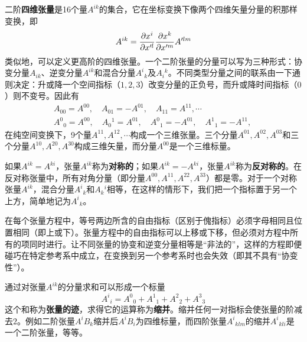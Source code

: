 二阶{\bf 四维张量}是16个量$A^{ik}$的集合，它在坐标变换下像两个四维矢量分量的积那样变换，即
\begin{equation}
	A^{ik} = \frac{\partial x^i}{\partial x'^l} \frac{\partial x^k}{\partial x'^m} A'^{lm}
	\label{chapter1:四维张量的变换规则}
\end{equation}
类似地，可以定义更高阶的四维张量。一个二阶张量的分量可以写为三种形式：协变分量$A_{ik}$、逆变分量$A^{ik}$和混合分量$A^i{}_k$及$A_i{}^k$。不同类型分量之间的联系由一下通则决定：升或降一个空间指标（$1,2,3$）改变分量的正负号，而升或降时间指标（$0$）则不变号。因此有
\begin{align*}
	& A_{00} = A^{00},\quad A_{01} = -A^{01},\quad A_{11} = A^{11},\cdots \\
	& A^0{}_0 = A^{00},\quad A_0{}^1 = A^{01},\quad A^0{}_1 = -A^{01},\quad A^1{}_1 = -A^{11},\quad 
\end{align*}
在纯空间变换下，9个量$A^{11},A^{12},\cdots$构成一个三维张量。三个分量$A^{01},A^{02},A^{03}$和三个分量$A^{10},A^{20},A^{30}$构成三维矢量，而分量$A^{00}$是一个三维标量。

如果$A^{ik} = A^{ki}$，张量$A^{ik}$称为{\bf 对称的}；如果$A^{ik} = -A^{ki}$，张量$A^{ik}$称为{\bf 反对称的}。在反对称张量中，所有对角分量（即分量$A^{00},A^{11},A^{22},A^{33}$）都是零。对于一个对称张量$A^{ik}$，混合分量$A^i{}_k$和$A_k{}^i$相等，在这样的情形下，我们把一个指标置于另一个上方，简单地记为$A^i{}_k$。

在每个张量方程中，等号两边所含的自由指标（区别于傀指标）必须字母相同且位置相同（即上或下）。张量方程中的自由指标可以上移或下移，但必须对方程中所有的项同时进行。让不同张量的协变和逆变分量相等是“非法的”，这样的方程即便碰巧在特定参考系中成立，在变换到另一个参考系时也会失效（即其不具有“协变性”）。

通过对张量$A^{ik}$的分量求和可以形成一个标量
\begin{equation*}
	A^i{}_i = A^0{}_0 + A^1{}_1 + A^2{}_2 + A^3{}_3
\end{equation*}
这个和称为{\bf 张量的迹}，求得它的运算称为{\bf 缩并}。缩并任何一对指标会使张量的阶减去$2$。例如二阶张量$A^iB_k$缩并后$A^iB_i$为四维标量，而四阶张量$A^i{}_{klm}$的缩并$A^i{}_{kli}$是一个二阶张量，等等。

